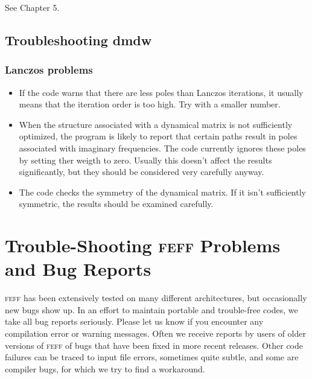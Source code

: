 \documentclass[11pt,oneside]{report} %
\renewcommand{\htmlref}[2]{\hyperlink{#2}{#1}}
\newcommand{\program}[1]{\textsc{#1}}
\newcommand{\feff}{\program{feff}}
\newcommand{\module}[1]{\textrm{\bf{#1}}}
\renewcommand{\htmlref}[2]{{#1}} %
\begin{document}
\begin{latexonly}
See \htmlref{Chapter 5}{sec:DWfactors}.

\section{Troubleshooting \module{dmdw}}
\label{sec:Append-G-DMDW-Trouble}

\subsection{Lanczos problems}
\begin{itemize}
\item If the code warns that there are less poles than Lanczos iterations, it
  usually means that the iteration order is too high. Try with a smaller
  number.

\item When the structure associated with a dynamical matrix is not sufficiently
  optimized, the program is likely to report that certain paths result in
  poles associated with imaginary frequencies. The code currently ignores
  these poles by setting ther weigth to zero. Usually this doesn't affect the
  results significantly, but they should be considered very carefully anyway.

\item The code checks the symmetry of the dynamical matrix. If it isn't sufficiently
  symmetric, the results should be examined carefully.
\end{itemize}



\chapter{Trouble-Shooting {\feff} Problems and Bug Reports}
\label{sec:Append-H-Trouble}

{\feff} has been extensively tested on many different architectures,
but occasionally new bugs show up. In an effort to maintain portable
and trouble-free codes, we take all bug reports seriously. Please
let us know if you encounter any compilation error or warning messages.
Often we receive reports by users of older
versions of {\feff} of bugs that have been fixed in more recent
releases. Other code failures can be traced to input file
errors, sometimes quite subtle, and some are compiler bugs, for which
we try to find a workaround.


\end{latexonly}
\end{document}
